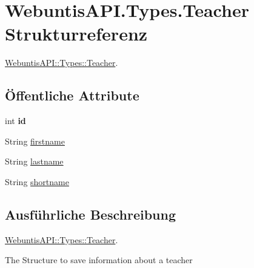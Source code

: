 \hypertarget{struct_webuntis_a_p_i_1_1_types_1_1_teacher}{\section{Webuntis\-A\-P\-I.\-Types.\-Teacher Strukturreferenz}
\label{struct_webuntis_a_p_i_1_1_types_1_1_teacher}
}


\hyperlink{struct_webuntis_a_p_i_1_1_types_1_1_teacher}{Webuntis\-A\-P\-I\-::\-Types\-::\-Teacher}.  


\subsection*{Öffentliche Attribute}
\begin{DoxyCompactItemize}
\item 
\hypertarget{struct_webuntis_a_p_i_1_1_types_1_1_teacher_a821dc00e09892946f7aa65066147b219}{int {\bfseries id}}\label{struct_webuntis_a_p_i_1_1_types_1_1_teacher_a821dc00e09892946f7aa65066147b219}

\item 
String \hyperlink{struct_webuntis_a_p_i_1_1_types_1_1_teacher_a60aa3278d7509fea3a5fd3e9d7e12e91}{firstname}
\item 
String \hyperlink{struct_webuntis_a_p_i_1_1_types_1_1_teacher_add1e2bb30e82e7ff0b14b3d497c44fcc}{lastname}
\item 
String \hyperlink{struct_webuntis_a_p_i_1_1_types_1_1_teacher_ad4fe004e4ae11294e487a92947f3ff41}{shortname}
\end{DoxyCompactItemize}


\subsection{Ausführliche Beschreibung}
\hyperlink{struct_webuntis_a_p_i_1_1_types_1_1_teacher}{Webuntis\-A\-P\-I\-::\-Types\-::\-Teacher}. 

The Structure to save information about a teacher 

